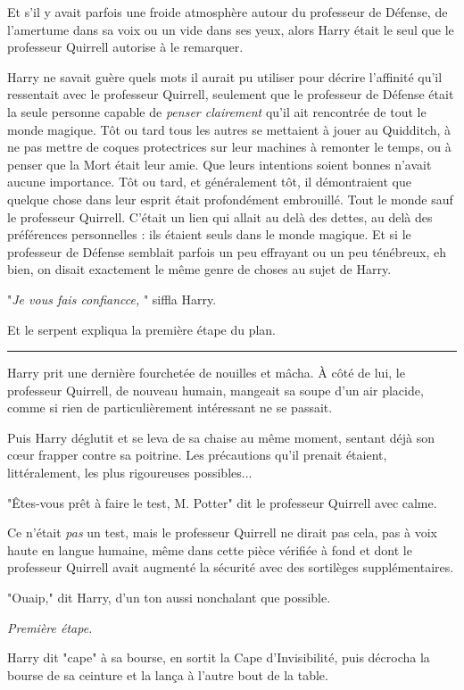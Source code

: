 Et s'il y avait parfois une froide atmosphère autour du professeur de Défense, de l'amertume dans sa voix ou un vide dans ses yeux, alors Harry était le seul que le professeur Quirrell autorise à le remarquer.

Harry ne savait guère quels mots il aurait pu utiliser pour décrire l'affinité qu'il ressentait avec le professeur Quirrell, seulement que le professeur de Défense était la seule personne capable de \emph{penser clairement}  qu'il ait rencontrée de tout le monde magique. Tôt ou tard tous les autres se mettaient à jouer au Quidditch, à ne pas mettre de coques protectrices sur leur machines à remonter le temps, ou à penser que la Mort était leur amie. Que leurs intentions soient bonnes n'avait aucune importance. Tôt ou tard, et généralement tôt, il démontraient que quelque chose dans leur esprit était profondément embrouillé. Tout le monde sauf le professeur Quirrell. C'était un lien qui allait au delà des dettes, au delà des préférences personnelles : ils étaient seuls dans le monde magique. Et si le professeur de Défense semblait parfois un peu effrayant ou un peu ténébreux, eh bien, on disait exactement le même genre de choses au sujet de Harry.

"\emph{Je vous fais confiancce,} " siffla Harry.

Et le serpent expliqua la première étape du plan.
\par\noindent\rule{\textwidth}{0.4pt}
Harry prit une dernière fourchetée de nouilles et mâcha. À côté de lui, le professeur Quirrell, de nouveau humain, mangeait sa soupe d'un air placide, comme si rien de particulièrement intéressant ne se passait.

Puis Harry déglutit et se leva de sa chaise au même moment, sentant déjà son cœur frapper contre sa poitrine. Les précautions qu'il prenait étaient, littéralement, les plus rigoureuses possibles...

"Êtes-vous prêt à faire le test, M. Potter" dit le professeur Quirrell avec calme.

Ce n'était \emph{pas}  un test, mais le professeur Quirrell ne dirait pas cela, pas à voix haute en langue humaine, même dans cette pièce vérifiée à fond et dont le professeur Quirrell avait augmenté la sécurité avec des sortilèges supplémentaires.

"Ouaip," dit Harry, d'un ton aussi nonchalant que possible.

\emph{Première étape.} 

Harry dit "cape" à sa bourse, en sortit la Cape d'Invisibilité, puis décrocha la bourse de sa ceinture et la lança à l'autre bout de la table.

